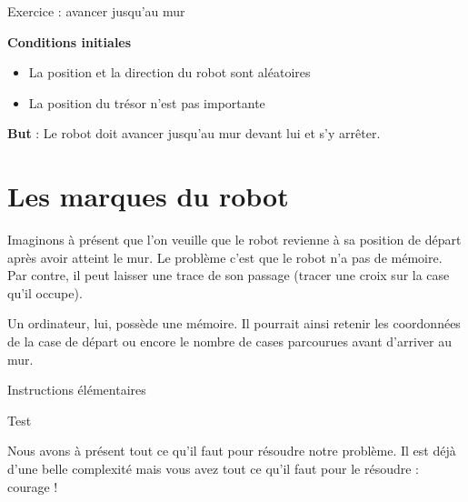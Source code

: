 	
	\begin{Emphase}[exercice]{Exercice : avancer jusqu'au mur}

		\textbf{Conditions initiales}

		\begin{itemize}
		\item La position et la direction du robot sont aléatoires
		\item La position du trésor n'est pas importante
		\end{itemize}
		
		\textbf{But} : Le robot doit avancer jusqu'au mur
		devant lui et s'y arrêter.

	\end{Emphase}

\section{Les marques du robot}

	Imaginons à présent que l'on veuille que le robot
	revienne à sa position de départ après avoir atteint le mur. Le
	problème c'est que le robot n'a pas
	de mémoire. Par contre, il peut laisser une trace de son passage
	(tracer une croix sur la case qu'il occupe).
	
	Un ordinateur, lui, possède une mémoire. Il pourrait ainsi retenir les
	coordonnées de la case de départ ou encore le nombre de cases
	parcourues avant d'arriver au mur.

	
	\begin{Emphase}[definition]{Instructions élémentaires}
	\end{Emphase}

	\begin{Emphase}{Test}
	\end{Emphase}

	Nous avons à présent tout ce qu'il faut pour résoudre
	notre problème. Il est déjà d'une belle complexité
	mais vous avez tout ce qu'il faut pour le résoudre :
	courage !

